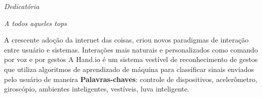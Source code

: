 \documentclass[
	12pt,				%
  oneside,
	a4paper,			%
	chapter=TITLE,		%
	english,			%
	brazil				%
	]{abntex2}
\begin{document}
\frenchspacing


\imprimircapa

\imprimirfolhaderosto

\imprimirfolhadeaprovacao
\begin{dedicatoria}
   \vspace*{\fill}
   \centering
   \noindent
   \textit{ Dedicatória }
   \vspace*{\fill}
\end{dedicatoria}

\begin{agradecimentos}[agradecimentos]


\end{agradecimentos}

\begin{epigrafe}
    \vspace*{\fill}
	\begin{flushright}
		\textit{A todos aqueles tops}
	\end{flushright}
\end{epigrafe}


\setlength{\absparsep}{18pt} %
\begin{resumo}[Resumo]
A crescente adoção da internet das coisas, criou novos paradigmas de interação entre usuário e sistemas. Interações mais naturais e personalizados como comando por voz e por gestos 
A Hand.io é um sistema vestível de reconhecimento de gestos que utiliza algoritmos de aprendizado de máquina para classificar sinais enviados pelo usuário de maneira 
  \textbf{Palavras-chaves}: controle de dispositivos, acelerômetro, giroscópio, ambientes inteligentes, vestíveis, luva inteligente.
\end{resumo}

\renewcommand{\listfigurename}{Lista de Figuras}
\listoffigures*
\cleardoublepage
\end{document}
